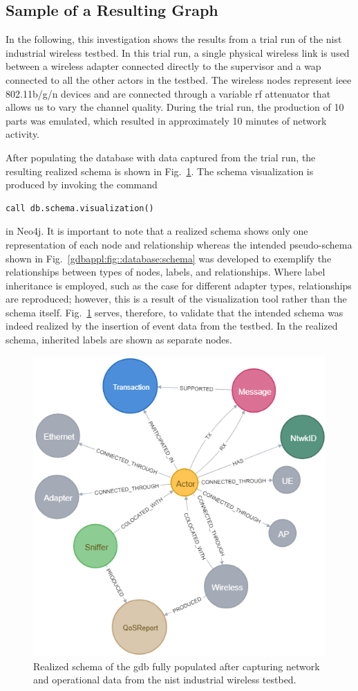 \subsection{Sample of a Resulting Graph}
In the following, this investigation shows the results from a trial run of the \gls{nist} industrial wireless testbed. In this trial run, a single physical wireless link is used between a wireless adapter connected directly to the supervisor and a \Gls{wap} connected to all the other actors in the testbed. The wireless nodes represent \gls{ieee} 802.11b/g/n devices and are connected through a variable \gls{rf} attenuator that allows us to vary the channel quality. During the trial run, the production of 10 parts was emulated, which resulted in approximately 10 minutes of network activity.       

After populating the database with data captured from the trial run, the resulting realized schema is shown in Fig.~\ref{gdbappl:fig::real-schema}. The schema visualization is produced by invoking the command

\begin{lstlisting}
call db.schema.visualization()
\end{lstlisting} 
in Neo4j. It is important to note that a realized schema shows only one representation of each node and relationship whereas the intended pseudo-schema shown in Fig.~\ref{gdbappl:fig::database:schema} was developed to exemplify the relationships between types of nodes, labels, and relationships. Where label inheritance is employed, such as the case for different adapter types, relationships are reproduced; however, this is a result of the visualization tool rather than the schema itself.  Fig.~\ref{gdbappl:fig::real-schema} serves, therefore, to validate that the intended schema was indeed realized by the insertion of event data from the testbed. In the realized schema, inherited labels are shown as separate nodes.

\begin{figure}[!ht]
    \centering
    \includegraphics[width=0.65\columnwidth]{./chapter-gdb-appl/figures/database/graph_schema.png}
    \caption{Realized schema of the \gls{gdb} fully populated after capturing network and operational data from the \gls{nist} industrial wireless testbed. }
    \label{gdbappl:fig::real-schema}
\end{figure}

